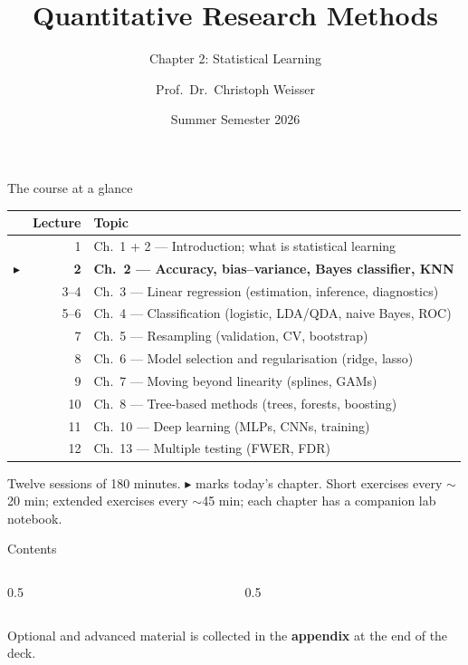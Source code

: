 \documentclass[aspectratio=169,11pt]{beamer}
\title{Quantitative Research Methods}
\subtitle{Chapter 2: Statistical Learning}
\author{Prof.\ Dr.\ Christoph Weisser}\institute{HSBI}
\date{Summer Semester 2026}\graphicspath{{images/}}
\begin{document}
\begin{frame}[plain]\titlepage\end{frame}

\begin{frame}{The course at a glance}
  \footnotesize
  \begin{center}
  \begin{tabular}{@{}c r l@{}}
    & \textbf{Lecture} & \textbf{Topic}\\
    \midrule
     & 1 & Ch.\ 1 + 2 --- Introduction; what is statistical learning \\
    $\blacktriangleright$ & \textbf{2} & \textbf{Ch.\ 2 --- Accuracy, bias--variance, Bayes classifier, KNN} \\
     & 3--4 & Ch.\ 3 --- Linear regression (estimation, inference, diagnostics) \\
     & 5--6 & Ch.\ 4 --- Classification (logistic, LDA/QDA, naive Bayes, ROC) \\
     & 7 & Ch.\ 5 --- Resampling (validation, CV, bootstrap) \\
     & 8 & Ch.\ 6 --- Model selection and regularisation (ridge, lasso) \\
     & 9 & Ch.\ 7 --- Moving beyond linearity (splines, GAMs) \\
     & 10 & Ch.\ 8 --- Tree-based methods (trees, forests, boosting) \\
     & 11 & Ch.\ 10 --- Deep learning (MLPs, CNNs, training) \\
     & 12 & Ch.\ 13 --- Multiple testing (FWER, FDR) \\
  \end{tabular}
  \end{center}
  \vspace{2pt}
  {\scriptsize Twelve sessions of 180 minutes. $\blacktriangleright$ marks today's chapter. Short exercises every $\sim$20 min; extended exercises every $\sim$45 min; each chapter has a companion lab notebook.}
\end{frame}


\begin{frame}{Contents}
  \begin{columns}[t]
    \begin{column}{0.5\textwidth}
      \tableofcontents[hideallsubsections,sections={1-6}]
    \end{column}
    \begin{column}{0.5\textwidth}
      \tableofcontents[hideallsubsections,sections={7-11}]
    \end{column}
  \end{columns}
  \vfill
  {\tiny Optional and advanced material is collected in the \textbf{appendix} at the end of the deck.}
\end{frame}
\end{document}
